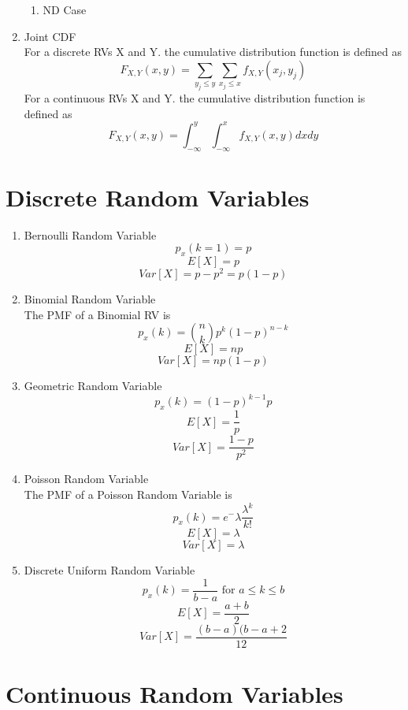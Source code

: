 \documentclass{article}
\begin{document}
\begin{enumerate}
\begin{enumerate}
        \item ND Case \\
        
    \end{enumerate}
    
    \item Joint CDF \\ 
    For a discrete RVs X and Y. the cumulative distribution function is defined as 
    $$F_{X,Y}(x,y) = \sum_{y_j \leq y}\sum_{x_j \leq x}f_{X,Y}(x_j,y_j)$$
    For a continuous RVs X and Y. the cumulative distribution function is defined as 
    $$F_{X,Y}(x,y) = \int_{-\infty}^{y}\int_{-\infty}^{x}f_{X,Y}(x,y)dxdy$$
\end{enumerate}

\section{Discrete Random Variables}

\begin{enumerate}
    \item Bernoulli Random Variable \\
    $$p_x(k = 1) = p $$
    $$E[X] = p$$
    $$Var[X] = p - p^2 = p(1 - p)$$
    
    \item Binomial Random Variable \\
    The PMF of a Binomial RV is 
    $$p_x(k) = {n \choose k}p^k(1-p)^{n-k}$$
    $$E[X] = np$$
    $$Var[X] = np(1-p)$$
    
    \item Geometric Random Variable \\
    $$p_x(k) = (1 - p)^{k-1}p$$
    $$E[X] = \frac{1}{p}$$
    $$Var[X] = \frac{1 - p}{p^2}$$
    
    \item Poisson Random Variable \\
    The PMF of a Poisson Random Variable is 
    $$p_x(k) = e^-\lambda\frac{\lambda^k}{k!}$$
    $$E[X] = \lambda$$
    $$Var[X] = \lambda$$
    
    \item Discrete Uniform Random Variable \\ 
    $$p_x(k) = \frac{1}{b-a} \text{  for } a \leq k \leq b$$
    $$E[X] = \frac{a+b}{2}$$
    $$Var[X] = \frac{(b-a)(b-a+2}{12}$$
\end{enumerate}

\section{Continuous Random Variables}
\end{document}
